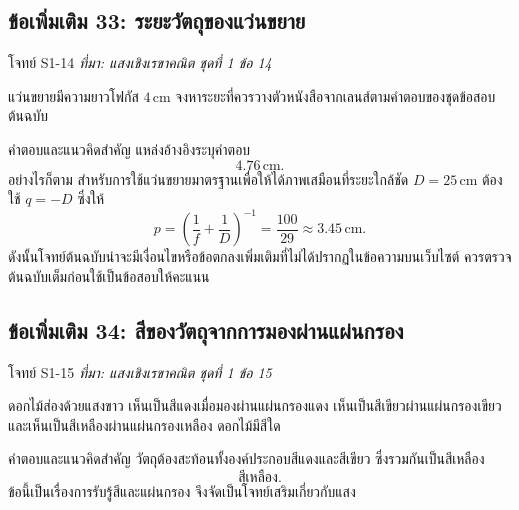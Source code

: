 \subsection{ข้อเพิ่มเติม 33: ระยะวัตถุของแว่นขยาย}

\begin{exercisebox}{โจทย์ S1-14}
\textit{ที่มา: แสงเชิงเรขาคณิต ชุดที่ 1 ข้อ 14}

แว่นขยายมีความยาวโฟกัส $4\,\mathrm{cm}$ จงหาระยะที่ควรวางตัวหนังสือจากเลนส์ตามคำตอบของชุดข้อสอบต้นฉบับ
\end{exercisebox}

\begin{examplebox}{คำตอบและแนวคิดสำคัญ}
แหล่งอ้างอิงระบุคำตอบ
\[
\boxed{4.76\,\mathrm{cm}}.
\]
อย่างไรก็ตาม สำหรับการใช้แว่นขยายมาตรฐานเพื่อให้ได้ภาพเสมือนที่ระยะใกล้ชัด $D=25\,\mathrm{cm}$ ต้องใช้ $q=-D$ ซึ่งให้
\[
p=\left(\frac1f+\frac1D\right)^{-1}=\frac{100}{29}\approx3.45\,\mathrm{cm}.
\]
ดังนั้นโจทย์ต้นฉบับน่าจะมีเงื่อนไขหรือข้อตกลงเพิ่มเติมที่ไม่ได้ปรากฏในข้อความบนเว็บไซต์ ควรตรวจต้นฉบับเต็มก่อนใช้เป็นข้อสอบให้คะแนน
\end{examplebox}

\subsection{ข้อเพิ่มเติม 34: สีของวัตถุจากการมองผ่านแผ่นกรอง}

\begin{exercisebox}{โจทย์ S1-15}
\textit{ที่มา: แสงเชิงเรขาคณิต ชุดที่ 1 ข้อ 15}

ดอกไม้ส่องด้วยแสงขาว เห็นเป็นสีแดงเมื่อมองผ่านแผ่นกรองแดง เห็นเป็นสีเขียวผ่านแผ่นกรองเขียว และเห็นเป็นสีเหลืองผ่านแผ่นกรองเหลือง ดอกไม้มีสีใด
\end{exercisebox}

\begin{examplebox}{คำตอบและแนวคิดสำคัญ}
วัตถุต้องสะท้อนทั้งองค์ประกอบสีแดงและสีเขียว ซึ่งรวมกันเป็นสีเหลือง
\[
\boxed{\text{สีเหลือง}}.
\]
ข้อนี้เป็นเรื่องการรับรู้สีและแผ่นกรอง จึงจัดเป็นโจทย์เสริมเกี่ยวกับแสง
\end{examplebox}

\fussy

